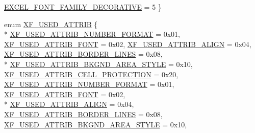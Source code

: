 \begin{DoxyCompactItemize}
\hyperlink{namespace_excel_format_a4f47c1508e4d09e1e52265feed4bedffa9e9228b64e3bf56fd30b5e6e056b7745}{E\+X\+C\+E\+L\+\_\+\+F\+O\+N\+T\+\_\+\+F\+A\+M\+I\+L\+Y\+\_\+\+D\+E\+C\+O\+R\+A\+T\+I\+V\+E} = 5
 \}
\item 
enum \hyperlink{namespace_excel_format_a416e692866c1c1dab69f10df49071bd1}{X\+F\+\_\+\+U\+S\+E\+D\+\_\+\+A\+T\+T\+R\+I\+B} \{ \\*
\hyperlink{namespace_excel_format_a416e692866c1c1dab69f10df49071bd1a382b7d2c30fcc635461d2cbeebf21d1a}{X\+F\+\_\+\+U\+S\+E\+D\+\_\+\+A\+T\+T\+R\+I\+B\+\_\+\+N\+U\+M\+B\+E\+R\+\_\+\+F\+O\+R\+M\+A\+T} = 0x01, 
\hyperlink{namespace_excel_format_a416e692866c1c1dab69f10df49071bd1a1dcb9bde39270f34af1b6cde0adbf25a}{X\+F\+\_\+\+U\+S\+E\+D\+\_\+\+A\+T\+T\+R\+I\+B\+\_\+\+F\+O\+N\+T} = 0x02, 
\hyperlink{namespace_excel_format_a416e692866c1c1dab69f10df49071bd1a6a8c806126ea5a6f64a83013008b97db}{X\+F\+\_\+\+U\+S\+E\+D\+\_\+\+A\+T\+T\+R\+I\+B\+\_\+\+A\+L\+I\+G\+N} = 0x04, 
\hyperlink{namespace_excel_format_a416e692866c1c1dab69f10df49071bd1a9c1e3100a9d887b7799153af7f531034}{X\+F\+\_\+\+U\+S\+E\+D\+\_\+\+A\+T\+T\+R\+I\+B\+\_\+\+B\+O\+R\+D\+E\+R\+\_\+\+L\+I\+N\+E\+S} = 0x08, 
\\*
\hyperlink{namespace_excel_format_a416e692866c1c1dab69f10df49071bd1a9cf1d8d37f1c943393be205b1db4dd5a}{X\+F\+\_\+\+U\+S\+E\+D\+\_\+\+A\+T\+T\+R\+I\+B\+\_\+\+B\+K\+G\+N\+D\+\_\+\+A\+R\+E\+A\+\_\+\+S\+T\+Y\+L\+E} = 0x10, 
\hyperlink{namespace_excel_format_a416e692866c1c1dab69f10df49071bd1aae3141debd962b0e393d151d3dedc0e7}{X\+F\+\_\+\+U\+S\+E\+D\+\_\+\+A\+T\+T\+R\+I\+B\+\_\+\+C\+E\+L\+L\+\_\+\+P\+R\+O\+T\+E\+C\+T\+I\+O\+N} = 0x20, 
\hyperlink{namespace_excel_format_a416e692866c1c1dab69f10df49071bd1a382b7d2c30fcc635461d2cbeebf21d1a}{X\+F\+\_\+\+U\+S\+E\+D\+\_\+\+A\+T\+T\+R\+I\+B\+\_\+\+N\+U\+M\+B\+E\+R\+\_\+\+F\+O\+R\+M\+A\+T} = 0x01, 
\hyperlink{namespace_excel_format_a416e692866c1c1dab69f10df49071bd1a1dcb9bde39270f34af1b6cde0adbf25a}{X\+F\+\_\+\+U\+S\+E\+D\+\_\+\+A\+T\+T\+R\+I\+B\+\_\+\+F\+O\+N\+T} = 0x02, 
\\*
\hyperlink{namespace_excel_format_a416e692866c1c1dab69f10df49071bd1a6a8c806126ea5a6f64a83013008b97db}{X\+F\+\_\+\+U\+S\+E\+D\+\_\+\+A\+T\+T\+R\+I\+B\+\_\+\+A\+L\+I\+G\+N} = 0x04, 
\hyperlink{namespace_excel_format_a416e692866c1c1dab69f10df49071bd1a9c1e3100a9d887b7799153af7f531034}{X\+F\+\_\+\+U\+S\+E\+D\+\_\+\+A\+T\+T\+R\+I\+B\+\_\+\+B\+O\+R\+D\+E\+R\+\_\+\+L\+I\+N\+E\+S} = 0x08, 
\hyperlink{namespace_excel_format_a416e692866c1c1dab69f10df49071bd1a9cf1d8d37f1c943393be205b1db4dd5a}{X\+F\+\_\+\+U\+S\+E\+D\+\_\+\+A\+T\+T\+R\+I\+B\+\_\+\+B\+K\+G\+N\+D\+\_\+\+A\+R\+E\+A\+\_\+\+S\+T\+Y\+L\+E} = 0x10, 

\end{DoxyCompactItemize}
